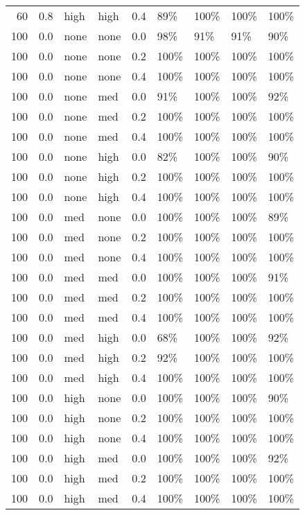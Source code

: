 \begin{longtable}{rrllrllll}
  60 & 0.8 & high & high & 0.4 & 89\% & 100\% & 100\% & 100\% \\ 
  100 & 0.0 & none & none & 0.0 & 98\% & 91\% & 91\% & 90\% \\ 
  100 & 0.0 & none & none & 0.2 & 100\% & 100\% & 100\% & 100\% \\ 
  100 & 0.0 & none & none & 0.4 & 100\% & 100\% & 100\% & 100\% \\ 
  100 & 0.0 & none & med & 0.0 & 91\% & 100\% & 100\% & 92\% \\ 
  100 & 0.0 & none & med & 0.2 & 100\% & 100\% & 100\% & 100\% \\ 
  100 & 0.0 & none & med & 0.4 & 100\% & 100\% & 100\% & 100\% \\ 
  100 & 0.0 & none & high & 0.0 & 82\% & 100\% & 100\% & 90\% \\ 
  100 & 0.0 & none & high & 0.2 & 100\% & 100\% & 100\% & 100\% \\ 
  100 & 0.0 & none & high & 0.4 & 100\% & 100\% & 100\% & 100\% \\ 
  100 & 0.0 & med & none & 0.0 & 100\% & 100\% & 100\% & 89\% \\ 
  100 & 0.0 & med & none & 0.2 & 100\% & 100\% & 100\% & 100\% \\ 
  100 & 0.0 & med & none & 0.4 & 100\% & 100\% & 100\% & 100\% \\ 
  100 & 0.0 & med & med & 0.0 & 100\% & 100\% & 100\% & 91\% \\ 
  100 & 0.0 & med & med & 0.2 & 100\% & 100\% & 100\% & 100\% \\ 
  100 & 0.0 & med & med & 0.4 & 100\% & 100\% & 100\% & 100\% \\ 
  100 & 0.0 & med & high & 0.0 & 68\% & 100\% & 100\% & 92\% \\ 
  100 & 0.0 & med & high & 0.2 & 92\% & 100\% & 100\% & 100\% \\ 
  100 & 0.0 & med & high & 0.4 & 100\% & 100\% & 100\% & 100\% \\ 
  100 & 0.0 & high & none & 0.0 & 100\% & 100\% & 100\% & 90\% \\ 
  100 & 0.0 & high & none & 0.2 & 100\% & 100\% & 100\% & 100\% \\ 
  100 & 0.0 & high & none & 0.4 & 100\% & 100\% & 100\% & 100\% \\ 
  100 & 0.0 & high & med & 0.0 & 100\% & 100\% & 100\% & 92\% \\ 
  100 & 0.0 & high & med & 0.2 & 100\% & 100\% & 100\% & 100\% \\ 
  100 & 0.0 & high & med & 0.4 & 100\% & 100\% & 100\% & 100\% \\ 

\end{longtable}
